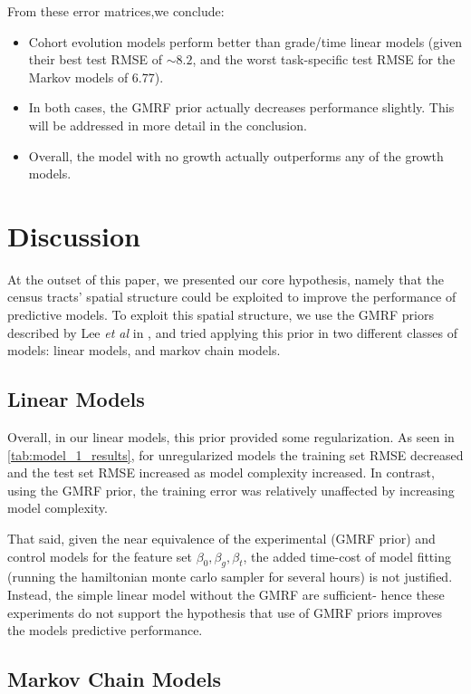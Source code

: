 \documentclass[journal]{IEEEtran}
\begin{document}
From these error matrices,we conclude:
\begin{itemize}
\item Cohort evolution models perform better than grade/time linear models (given their best test RMSE of \(\sim8.2\), and the worst task-specific test RMSE for the Markov models of 6.77).
\item In both cases, the GMRF prior actually decreases performance slightly. This will be addressed in more detail in the conclusion.
\item Overall, the model with no growth actually outperforms any of the growth models.
\end{itemize}

\section{Discussion}

At the outset of this paper, we presented our core hypothesis, namely that the census tracts' spatial structure could be exploited to improve the performance of predictive models. To exploit this spatial structure, we use the GMRF priors described by Lee \emph{et al} in \cite{lee2015carbayesst}, and tried applying this prior in two different classes of models: linear models, and markov chain models.
\subsection{Linear Models}

Overall, in our linear models, this prior provided some regularization. As seen in \ref{tab:model_1_results}, for unregularized models the training set RMSE decreased and the test set RMSE increased as model complexity increased. In contrast, using the GMRF prior, the training error was relatively unaffected by increasing model complexity.

That said, given the near equivalence of the experimental (GMRF prior) and control models for the feature set \({\beta_0, \beta_g, \beta_t}\), the added time-cost of model fitting (running the hamiltonian monte carlo sampler for several hours) is not justified. Instead, the simple linear model without the GMRF are sufficient- hence these experiments do not support the hypothesis that use of GMRF priors improves the models predictive performance. 

\subsection{Markov Chain Models}
\end{document}
